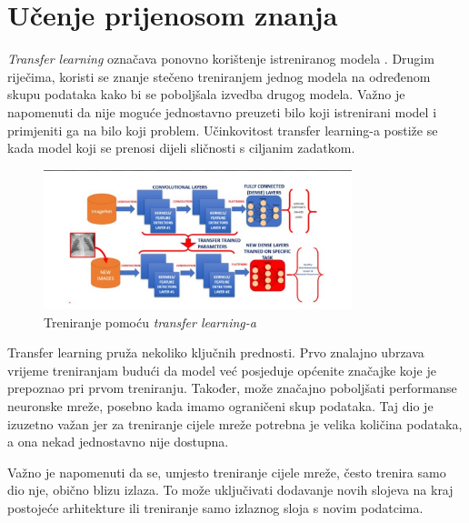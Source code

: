 
\chapter{Učenje prijenosom znanja}\label{ch:transfer-learning}

\emph{Transfer learning} označava ponovno korištenje istreniranog modela .
Drugim riječima, koristi se znanje stečeno treniranjem jednog modela na određenom skupu podataka kako bi se poboljšala izvedba drugog modela.
Važno je napomenuti da nije moguće jednostavno preuzeti bilo koji istrenirani model i primjeniti ga na bilo koji problem.
Učinkovitost transfer learning-a postiže se kada model koji se prenosi dijeli sličnosti s ciljanim zadatkom.

\FloatBarrier
\begin{figure}[h]
    \centering
    \includegraphics[width=0.8\textwidth]{images/Transfer-learning}
    \caption{Treniranje pomoću \emph{transfer learning-a}
    \protect\footnotemark}
    \label{fig:slika17}
\end{figure}
\FloatBarrier
{}

Transfer learning pruža nekoliko ključnih prednosti.
Prvo znalajno ubrzava vrijeme treniranjam budući da model već posjeduje općenite značajke koje je prepoznao pri prvom treniranju.
Također, može značajno poboljšati performanse neuronske mreže, posebno kada imamo ograničeni skup podataka.
Taj dio je izuzetno važan jer za treniranje cijele mreže potrebna je velika količina podataka, a ona nekad jednostavno nije dostupna.

Važno je napomenuti da se, umjesto treniranje cijele mreže, često trenira samo dio nje, obično blizu izlaza.
To može uključivati dodavanje novih slojeva na kraj postojeće arhitekture ili treniranje samo izlaznog sloja s novim podatcima.
